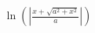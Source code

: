\documentclass[preview]{standalone}
\begin{document}
\begin{align*}
\ln(|\frac{x+\sqrt{a^2+x^2}}{a}|)
\end{align*}
\end{document}
